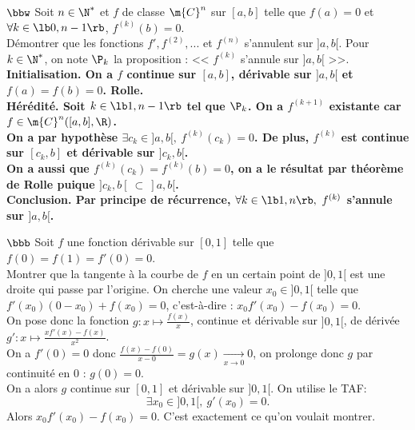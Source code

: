 \documentclass[11pt]{article}
\begin{document}
\begin{exercice}{$\bbw$}{}
    Soit $n\in\N^*$ et $f$ de classe $\m{C}^n$ sur $[a,b]$ telle que $f(a)=0$ et $\forall k \in \lb0,n-1\rb$, $f^{(k)}(b)=0$.\\
    Démontrer que les fonctions $f',f^{(2)},...$ et $f^{(n)}$ s'annulent sur $]a,b[$.
    \tcblower
    Pour $k\in\N^*$, on note $\P_k$ la proposition : << $f^{(k)}$ s'annule sur $]a,b[$ >>.\\
    \bf{Initialisation.} On a $f$ continue sur $[a,b]$, dérivable sur $]a,b[$ et $f(a)=f(b)=0$. Rolle.\\
    \bf{Hérédité.} Soit $k\in\lb1,n-1\rb$ tel que $\P_k$. On a $f^{(k+1)}$ existante car $f\in\m{C}^n([a,b],\R)$.\\
    On a par hypothèse $\exists c_k \in ]a,b[, ~ f^{(k)}(c_k)=0$. De plus, $f^{(k)}$ est continue sur $[c_k,b]$ et dérivable sur $]c_k,b[$.\\
    On a aussi que $f^{(k)}(c_k)=f^{(k)}(b)=0$, on a le résultat par théorème de Rolle puique $]c_k,b[~\subset~]a,b[$.\\
    \bf{Conclusion.} Par principe de récurrence, $\forall k \in \lb1,n\rb, ~ f^{(k)}$ s'annule sur $]a,b[$.
\end{exercice}

\begin{exercice}{$\bbb$}{}
    Soit $f$ une fonction dérivable sur $[0,1]$ telle que $f(0)=f(1)=f'(0)=0$.\\
    Montrer que la tangente à la courbe de $f$ en un certain point de $]0,1[$ est une droite qui passe par l'origine.
    \tcblower
    On cherche une valeur $x_0\in]0,1[$ telle que $f'(x_0)(0-x_0)+f(x_0)=0$, c'est-à-dire : $x_0f'(x_0)-f(x_0)=0$.\\
    On pose donc la fonction $g:x\mapsto\frac{f(x)}{x}$, continue et dérivable sur $]0,1[$, de dérivée $g':x\mapsto\frac{xf'(x)-f(x)}{x^2}$.\\
    On a $f'(0)=0$ donc $\frac{f(x)-f(0)}{x-0}=g(x)\xrightarrow[x\to0]{}0$, on prolonge donc $g$ par continuité en 0 : $g(0)=0$.\\
    On a alors $g$ continue sur $[0,1]$ et dérivable sur $]0,1[$. On utilise le TAF:
    \begin{equation*}
        \exists x_0 \in ]0,1[, ~ g'(x_0)=0.
    \end{equation*}
    Alors $x_0f'(x_0)-f(x_0)=0$. C'est exactement ce qu'on voulait montrer.
\end{exercice}

\vspace*{0.4cm}
\end{document}
